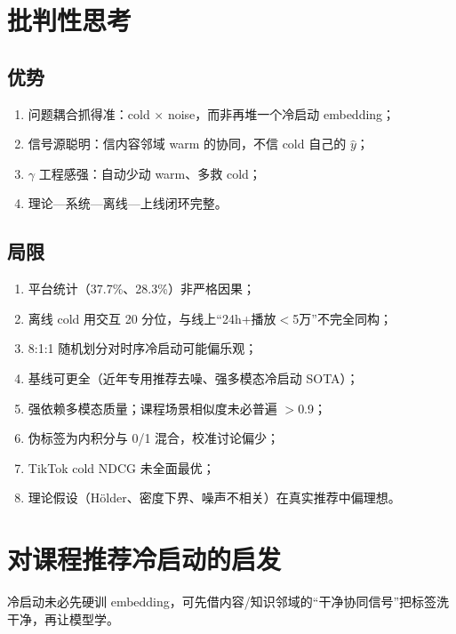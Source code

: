 \documentclass[11pt,a4paper]{ctexart}
\begin{document}
\section{批判性思考}

\subsection{优势}
\begin{enumerate}
  \item 问题耦合抓得准：cold $\times$ noise，而非再堆一个冷启动 embedding；
  \item 信号源聪明：信内容邻域 warm 的协同，不信 cold 自己的 $\hat{y}$；
  \item $\gamma$ 工程感强：自动少动 warm、多救 cold；
  \item 理论—系统—离线—上线闭环完整。
\end{enumerate}

\subsection{局限}
\begin{enumerate}
  \item 平台统计（37.7\%、28.3\%）非严格因果；
  \item 离线 cold 用交互 20 分位，与线上“24h+播放$<$5万”不完全同构；
  \item 8:1:1 随机划分对时序冷启动可能偏乐观；
  \item 基线可更全（近年专用推荐去噪、强多模态冷启动 SOTA）；
  \item 强依赖多模态质量；课程场景相似度未必普遍 $>$0.9；
  \item 伪标签为内积分与 0/1 混合，校准讨论偏少；
  \item TikTok cold NDCG 未全面最优；
  \item 理论假设（Hölder、密度下界、噪声不相关）在真实推荐中偏理想。
\end{enumerate}

\section{对课程推荐冷启动的启发}

\begin{keybox}[可迁移范式]
冷启动未必先硬训 embedding，可先借内容/知识邻域的“干净协同信号”把标签洗干净，再让模型学。
\end{keybox}
\end{document}
